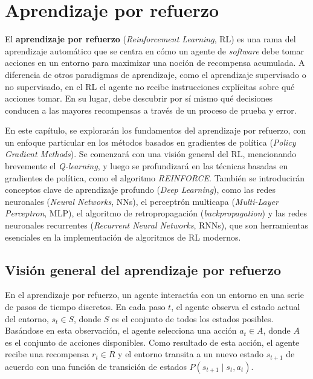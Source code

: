 \documentclass[11pt,a4paper,spanish]{article}
\numberwithin{equation}{section} %
\begin{document}
\newpage


\section{Aprendizaje por refuerzo}\label{sec:rl}

El \textbf{aprendizaje por refuerzo} (\textit{Reinforcement Learning}, RL) es una rama del aprendizaje automático que se centra en cómo un agente de \textit{software} debe tomar acciones en un entorno para maximizar una noción de recompensa acumulada. A diferencia de otros paradigmas de aprendizaje, como el aprendizaje supervisado o no supervisado, en el RL el agente no recibe instrucciones explícitas sobre qué acciones tomar. En su lugar, debe descubrir por sí mismo qué decisiones conducen a las mayores recompensas a través de un proceso de prueba y error.

En este capítulo, se explorarán los fundamentos del aprendizaje por refuerzo, con un enfoque particular en los métodos basados en gradientes de política (\textit{Policy Gradient Methods}). Se comenzará con una visión general del RL, mencionando brevemente el \textit{Q-learning}, y luego se profundizará en las técnicas basadas en gradientes de política, como el algoritmo \textit{REINFORCE}. También se introducirán conceptos clave de aprendizaje profundo (\textit{Deep Learning}), como las redes neuronales (\textit{Neural Networks}, NNs), el perceptrón multicapa (\textit{Multi-Layer Perceptron}, MLP), el algoritmo de retropropagación (\textit{backpropagation}) y las redes neuronales recurrentes (\textit{Recurrent Neural Networks}, RNNs), que son herramientas esenciales en la implementación de algoritmos de RL modernos.

\subsection{Visión general del aprendizaje por refuerzo}

En el aprendizaje por refuerzo, un agente interactúa con un entorno en una serie de pasos de tiempo discretos. En cada paso $t$, el agente observa el estado actual del entorno, $s_t \in S$, donde $S$ es el conjunto de todos los estados posibles. Basándose en esta observación, el agente selecciona una acción $a_t \in A$, donde $A$ es el conjunto de acciones disponibles. Como resultado de esta acción, el agente recibe una recompensa $r_t \in R$ y el entorno transita a un nuevo estado $s_{t+1}$ de acuerdo con una función de transición de estados $P(s_{t+1} \mid s_t, a_t)$.
\end{document}
